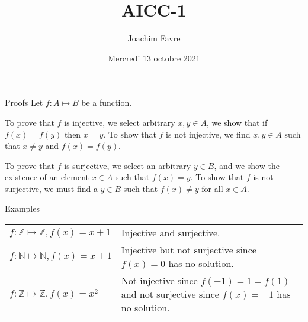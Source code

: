 \documentclass[a4paper]{article}
\title{AICC-1}
\author{Joachim Favre}
\date{Mercredi 13 octobre 2021}
\begin{document}
\maketitle


\begin{parag}{Proofs}
    Let $f : A \mapsto B$ be a function.

    To prove that $f$ is injective, we select arbitrary $x, y \in A$, we show that if $f\left(x\right) = f\left(y\right)$ then $x = y$. To show that $f$ is not injective, we find $x, y \in A$ such that $x \neq y$ and $f\left(x\right) = f\left(y\right).$

    To prove that $f$ is surjective, we select an arbitrary $y \in B$, and we show the existence of an element $x \in A$ such that $f\left(x\right) = y$. To show that $f$ is not surjective, we must find a $y \in B$ such that $f\left(x\right) \neq y$ for all $x \in A$.
\end{parag}

\begin{parag}{Examples}
    \begin{center}
        \begin{tabularx}{\linewidth}{>{\hsize=0.35\hsize}X>{\hsize=0.65\hsize}X}
        $f : \mathbb{Z} \mapsto \mathbb{Z}, f\left(x\right) = x + 1$ & Injective and surjective. \\
        $f : \mathbb{N} \mapsto \mathbb{N}, f\left(x\right) = x + 1$ & Injective but not surjective since $f\left(x\right) = 0$ has no solution.  \\
        $f : \mathbb{Z} \mapsto \mathbb{Z}, f\left(x\right) = x^2$ & Not injective since $f\left(-1\right) = 1 = f\left(1\right)$ and not surjective since $f\left(x\right) = -1$ has no solution.
    \end{tabularx} 
    \end{center}
\end{parag}
\end{document}
